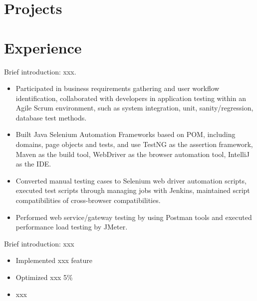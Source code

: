 \documentclass{resume}
\begin{document}




\section{Projects}


\section{Experience}
Brief introduction: xxx.
\begin{itemize}
  \item Participated in business requirements gathering and user workflow identification, collaborated with developers in application testing within an Agile Scrum environment, such as system integration, unit, sanity/regression, database test methods.
  \item Built Java Selenium Automation Frameworks based on POM, including domains, page objects and tests, and use TestNG as the assertion framework, Maven as the build tool, WebDriver as the browser automation tool, IntelliJ as the IDE.
  \item Converted manual testing cases to Selenium web driver automation scripts, executed test scripts through managing jobs with Jenkins, maintained script compatibilities of cross-browser compatibilities.
  \item Performed web service/gateway testing by using Postman tools and executed performance load testing by JMeter.
\end{itemize}

Brief introduction: xxx
\begin{itemize}
  \item Implemented xxx feature
  \item Optimized xxx 5\%
  \item xxx
\end{itemize}
\end{document}
